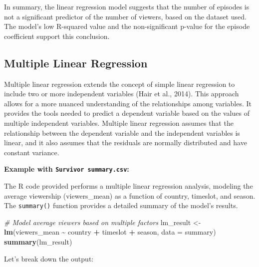 \documentclass[
]{book}
\newenvironment{Shaded}{\begin{snugshade}}{\end{snugshade}}
\newcommand{\AttributeTok}[1]{\textcolor[rgb]{0.13,0.29,0.53}{#1}}
\newcommand{\CommentTok}[1]{\textcolor[rgb]{0.56,0.35,0.01}{\textit{#1}}}
\newcommand{\FunctionTok}[1]{\textcolor[rgb]{0.13,0.29,0.53}{\textbf{#1}}}
\newcommand{\NormalTok}[1]{#1}
\newcommand{\OtherTok}[1]{\textcolor[rgb]{0.56,0.35,0.01}{#1}}
\newcommand{\SpecialCharTok}[1]{\textcolor[rgb]{0.81,0.36,0.00}{\textbf{#1}}}
\begin{document}
In summary, the linear regression model suggests that the number of episodes is not a significant predictor of the number of viewers, based on the dataset used. The model's low R-squared value and the non-significant p-value for the episode coefficient support this conclusion.

\subsection*{Multiple Linear Regression}\label{multiple-linear-regression}

Multiple linear regression extends the concept of simple linear regression to include two or more independent variables (Hair et al., 2014). This approach allows for a more nuanced understanding of the relationships among variables. It provides the tools needed to predict a dependent variable based on the values of multiple independent variables. Multiple linear regression assumes that the relationship between the dependent variable and the independent variables is linear, and it also assumes that the residuals are normally distributed and have constant variance.

\textbf{Example with \texttt{Survivor\ summary.csv}:}

The R code provided performs a multiple linear regression analysis, modeling the average viewership (viewers\_mean) as a function of country, timeslot, and season. The \texttt{summary()} function provides a detailed summary of the model's results.

\begin{Shaded}
\begin{Highlighting}[]
\CommentTok{\# Model average viewers based on multiple factors}
\NormalTok{lm\_result }\OtherTok{\textless{}{-}} \FunctionTok{lm}\NormalTok{(viewers\_mean }\SpecialCharTok{\textasciitilde{}}\NormalTok{ country }\SpecialCharTok{+}\NormalTok{ timeslot }\SpecialCharTok{+}\NormalTok{ season, }\AttributeTok{data =}\NormalTok{ summary)}
\FunctionTok{summary}\NormalTok{(lm\_result)}
\end{Highlighting}
\end{Shaded}

Let's break down the output:
\end{document}

